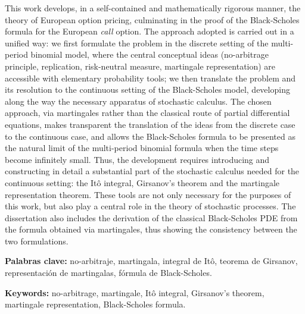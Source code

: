 \documentclass[11pt,a4paper,oneside]{report}
\theoremstyle{plain}
\theoremstyle{definition}
\theoremstyle{remark}
\newcommand{\1}{\mathbf{1}}
\begin{document}
This work develops, in a self-contained and mathematically rigorous
manner, the theory of European option pricing, culminating in the
proof of the Black-Scholes formula for the European \emph{call}
option. The approach adopted is carried out in a unified way: we
first formulate the problem in the discrete setting of the
multi-period binomial model, where the central conceptual ideas
(no-arbitrage principle, replication, risk-neutral measure,
martingale representation) are accessible with elementary probability
tools; we then translate the problem and its resolution to the
continuous setting of the Black-Scholes model, developing along the
way the necessary apparatus of stochastic calculus. The chosen
approach, via martingales rather than the classical route of partial
differential equations, makes transparent the translation of the
ideas from the discrete case to the continuous case, and allows the
Black-Scholes formula to be presented as the natural limit of the
multi-period binomial formula when the time steps become infinitely
small. Thus, the development requires introducing and constructing in detail a substantial part of the stochastic calculus needed for the continuous setting: the Itô integral, Girsanov’s theorem and the martingale representation theorem. These tools are not only necessary for the purposes of this work, but also play a central role in the theory of stochastic processes. The dissertation also includes the derivation of the classical Black-Scholes PDE from the formula obtained via martingales, thus showing the consistency between the two formulations.

\upshape

\vspace{0.3cm}
\noindent\textbf{Palabras clave:} no-arbitraje, martingala, integral
de Itô, teorema de Girsanov, representación de martingalas, fórmula
de Black-Scholes.

\vspace{0.15cm}
\noindent\textbf{Keywords:} no-arbitrage, martingale, Itô integral,
Girsanov's theorem, martingale representation, Black-Scholes formula.

\setcounter{tocdepth}{2}    %
\tableofcontents

\end{document}

